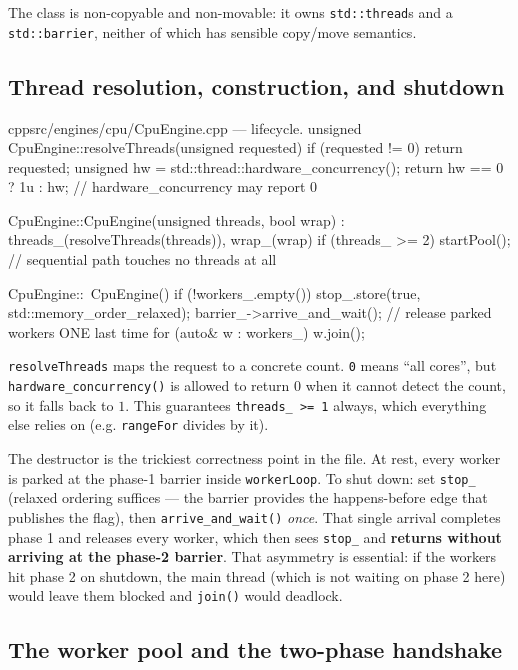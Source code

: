 \documentclass[
	english,
	letterpaper, oneside
]{article}
\begin{document}
The class is non-copyable and non-movable: it owns \texttt{std::thread}s and a
\texttt{std::barrier}, neither of which has sensible copy/move semantics.

\subsection{Thread resolution, construction, and shutdown}

\begin{sourcecode}{cpp}{src/engines/cpu/CpuEngine.cpp --- lifecycle.}
unsigned CpuEngine::resolveThreads(unsigned requested) {
  if (requested != 0) return requested;
  unsigned hw = std::thread::hardware_concurrency();
  return hw == 0 ? 1u : hw;            // hardware_concurrency may report 0
}

CpuEngine::CpuEngine(unsigned threads, bool wrap)
    : threads_(resolveThreads(threads)), wrap_(wrap) {
  if (threads_ >= 2) startPool();      // sequential path touches no threads at all
}

CpuEngine::~CpuEngine() {
  if (!workers_.empty()) {
    stop_.store(true, std::memory_order_relaxed);
    barrier_->arrive_and_wait();       // release parked workers ONE last time
    for (auto& w : workers_) w.join();
  }
}
\end{sourcecode}

\texttt{resolveThreads} maps the request to a concrete count. \texttt{0} means
``all cores'', but \texttt{hardware\_concurrency()} is allowed to return $0$ when
it cannot detect the count, so it falls back to $1$. This guarantees
\texttt{threads\_ >= 1} always, which everything else relies on (e.g.
\texttt{rangeFor} divides by it).

The destructor is the trickiest correctness point in the file. At rest, every
worker is parked at the phase-1 barrier inside \texttt{workerLoop}. To shut down:
set \texttt{stop\_} (relaxed ordering suffices --- the barrier provides the
happens-before edge that publishes the flag), then \texttt{arrive\_and\_wait()}
\emph{once}. That single arrival completes phase 1 and releases every worker,
which then sees \texttt{stop\_} and \textbf{returns without arriving at the
phase-2 barrier}. That asymmetry is essential: if the workers hit phase 2 on
shutdown, the main thread (which is not waiting on phase 2 here) would leave them
blocked and \texttt{join()} would deadlock.

\subsection{The worker pool and the two-phase handshake}
\end{document}
